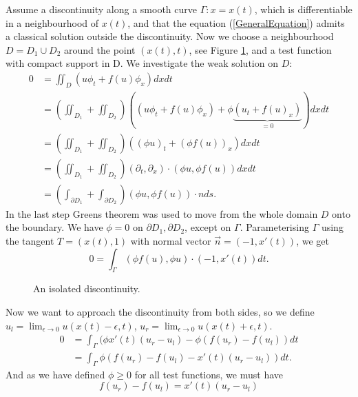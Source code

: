 \documentclass[10pt]{article}
\numberwithin{equation}{section}
\begin{document}
Assume a discontinuity along a smooth curve $\Gamma : x = x(t)$, which is differentiable in a neighbourhood of $x(t)$, and that the equation (\ref{GeneralEquation}) admits a classical solution outside the discontinuity. Now we choose a neighbourhood $D = D_1 \cup D_2$ around the point $(x(t), t)$, see Figure \ref{fig:ConservationLaws/RHIsolated_disc}, and a test function with compact support in D. We investigate the weak solution on $D$:
\begin{align*}
    0 &= \iint_D( u \phi_t + f(u)\phi_x) dx dt \\
      &= (\iint_{D_1}  +  \iint_{D_2}  )( (u \phi_t + f(u)\phi_x) + \phi \underbrace{(u_t + f(u)_x )}_{=0} ) dxdt\\
      &= (\iint_{D_1}  +  \iint_{D_2}  ) ( (\phi u )_t + (\phi f(u))_x ) dxdt \\
      &= (\iint_{D_1}  +  \iint_{D_2}  ) (\partial_t, \partial_x)\cdot (\phi u, \phi f(u)) dx dt \\
      &= (\int_{\partial D_1}  +  \int_{\partial D_2}  ) (\phi u, \phi f(u)) \cdot n ds.
\end{align*}
In the last step Greens theorem was used to move from the whole domain $D$ onto the boundary. We have $\phi = 0 $ on $\partial D_1, \partial D_2$, except on $\Gamma$. Parameterising $\Gamma$ using the tangent $T = (x(t), 1)$ with normal vector $\vec{n} = (-1, x'(t))$, we get
\begin{equation*}
    0 = \int_{\Gamma} (\phi f(u), \phi u) \cdot (-1, x'(t)) dt.
\end{equation*}
\begin{figure}
    \centering
    
    \caption{An isolated discontinuity.}
    \label{fig:ConservationLaws/RHIsolated_disc}
\end{figure}{}
Now we want to approach the discontinuity from both sides, so we define $u_l = \lim_{\epsilon \to 0} u(x(t) - \epsilon, t)$, $u_r = \lim_{\epsilon \to 0} u(x(t) + \epsilon, t)$.
\begin{align*}
    0 &= \int_{\Gamma} (\phi x'(t) (u_r - u_l) - \phi( f(u_r) - f(u_l))  dt \\
      &= \int_{\Gamma} \phi (  f(u_r) - f(u_l) - x'(t)(u_r - u_l) ) dt.
\end{align*}
And as we have defined $\phi \geq 0 $ for all test functions, we must have
\begin{equation*}
    f(u_r) - f(u_l)  = x'(t)(u_r - u_l) 
\end{equation*}
\end{document}
